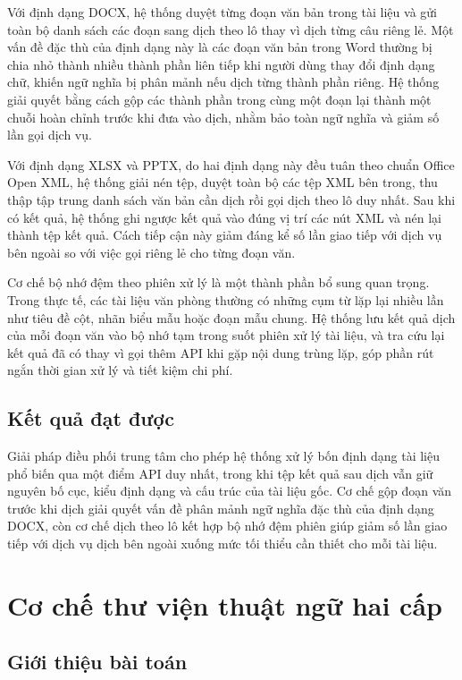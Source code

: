 \documentclass[../DoAn.tex]{subfiles}
\begin{document}
Với định dạng DOCX, hệ thống duyệt từng đoạn văn bản trong tài liệu và gửi toàn bộ danh sách các đoạn sang dịch theo lô thay vì dịch từng câu riêng lẻ. Một vấn đề đặc thù của định dạng này là các đoạn văn bản trong Word thường bị chia nhỏ thành nhiều thành phần liên tiếp khi người dùng thay đổi định dạng chữ, khiến ngữ nghĩa bị phân mảnh nếu dịch từng thành phần riêng. Hệ thống giải quyết bằng cách gộp các thành phần trong cùng một đoạn lại thành một chuỗi hoàn chỉnh trước khi đưa vào dịch, nhằm bảo toàn ngữ nghĩa và giảm số lần gọi dịch vụ.

Với định dạng XLSX và PPTX, do hai định dạng này đều tuân theo chuẩn Office Open XML, hệ thống giải nén tệp, duyệt toàn bộ các tệp XML bên trong, thu thập tập trung danh sách văn bản cần dịch rồi gọi dịch theo lô duy nhất. Sau khi có kết quả, hệ thống ghi ngược kết quả vào đúng vị trí các nút XML và nén lại thành tệp kết quả. Cách tiếp cận này giảm đáng kể số lần giao tiếp với dịch vụ bên ngoài so với việc gọi riêng lẻ cho từng đoạn văn.

Cơ chế bộ nhớ đệm theo phiên xử lý là một thành phần bổ sung quan trọng. Trong thực tế, các tài liệu văn phòng thường có những cụm từ lặp lại nhiều lần như tiêu đề cột, nhãn biểu mẫu hoặc đoạn mẫu chung. Hệ thống lưu kết quả dịch của mỗi đoạn văn vào bộ nhớ tạm trong suốt phiên xử lý tài liệu, và tra cứu lại kết quả đã có thay vì gọi thêm API khi gặp nội dung trùng lặp, góp phần rút ngắn thời gian xử lý và tiết kiệm chi phí.

\subsection{Kết quả đạt được}

Giải pháp điều phối trung tâm cho phép hệ thống xử lý bốn định dạng tài liệu phổ biến qua một điểm API duy nhất, trong khi tệp kết quả sau dịch vẫn giữ nguyên bố cục, kiểu định dạng và cấu trúc của tài liệu gốc. Cơ chế gộp đoạn văn trước khi dịch giải quyết vấn đề phân mảnh ngữ nghĩa đặc thù của định dạng DOCX, còn cơ chế dịch theo lô kết hợp bộ nhớ đệm phiên giúp giảm số lần giao tiếp với dịch vụ dịch bên ngoài xuống mức tối thiểu cần thiết cho mỗi tài liệu.

\section{Cơ chế thư viện thuật ngữ hai cấp}
\label{section:5.2}

\subsection{Giới thiệu bài toán}
\end{document}
